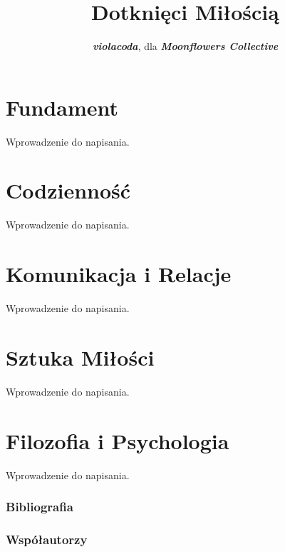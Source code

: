 \documentclass[]{coda-art}
\title{Dotknięci Miłością}
\author{\textbf{\emph{violacoda}}, dla \textbf{\emph{Moonflowers Collective}}}
\begin{document}
\maketitle
\tableofcontents


\clearpage\part{Fundament}
\label{fundament}

Wprowadzenie do napisania.

% 



\clearpage\part{Codzienność}
\label{codziennosc}

Wprowadzenie do napisania.

% 



\clearpage\part{Komunikacja i Relacje}
\label{komunikacja}

Wprowadzenie do napisania.

% 



\clearpage\part{Sztuka Miłości}
\label{sztuka}

Wprowadzenie do napisania.

% 



\clearpage\part{Filozofia i Psychologia}
\label{filozofia}

Wprowadzenie do napisania.

% 



\clearpage\section*{Bibliografia}
\label{bibliografia}



\clearpage\section*{Współautorzy}
\label{contributions}
\end{document}
